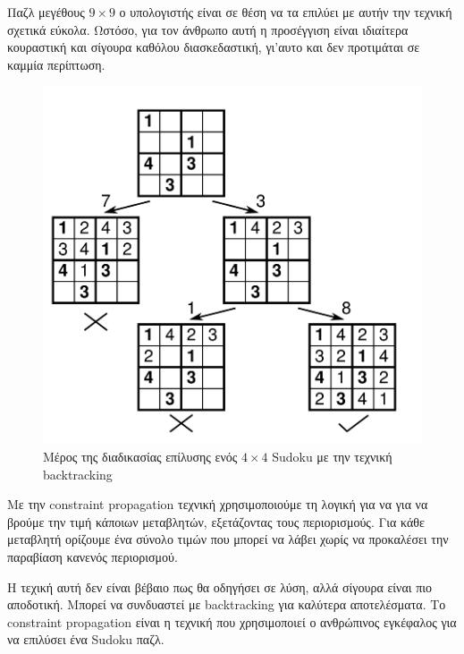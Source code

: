 \documentclass[oneside,12pt]{book}
\theoremstyle{definition}
\begin{document}
Παζλ μεγέθους \(9 \times 9\) ο υπολογιστής είναι σε θέση να τα επιλύει με αυτήν την τεχνική σχετικά εύκολα. Ωστόσο, για τον άνθρωπο αυτή η προσέγγιση είναι ιδιαίτερα κουραστική και σίγουρα καθόλου διασκεδαστική, γι'αυτο και δεν προτιμάται σε καμμία περίπτωση. \par

\begin{figure}[h]
	\centering
	\includegraphics[scale=0.45]{Figures/backtracking.png}
	\caption{Μέρος της διαδικασίας επίλυσης ενός \(4 \times 4\) Sudoku με την τεχνική backtracking}
\end{figure}

Με την constraint propagation τεχνική χρησιμοποιούμε τη λογική για να για να βρούμε την τιμή κάποιων μεταβλητών, εξετάζοντας τους περιορισμούς. Για κάθε μεταβλητή ορίζουμε ένα σύνολο τιμών που μπορεί να λάβει χωρίς να προκαλέσει την παραβίαση κανενός περιορισμού. \par

Η τεχική αυτή δεν είναι βέβαιο πως θα οδηγήσει σε λύση, αλλά σίγουρα είναι πιο αποδοτική. Μπορεί να συνδυαστεί με backtracking για καλύτερα αποτελέσματα. Το constraint propagation είναι η τεχνική που χρησιμοποιεί ο ανθρώπινος εγκέφαλος για να επιλύσει ένα Sudoku παζλ. \par
\end{document}
